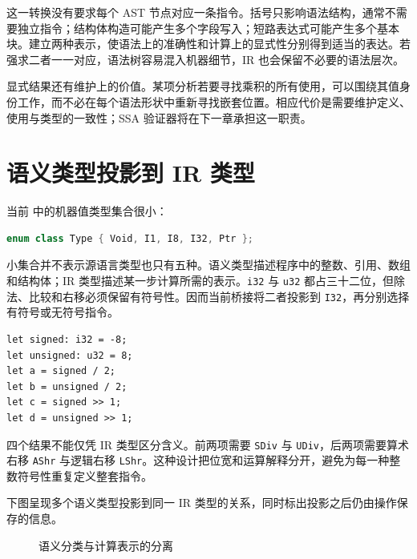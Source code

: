这一转换没有要求每个 AST 节点对应一条指令。括号只影响语法结构，通常不需要独立指令；结构体构造可能产生多个字段写入；短路表达式可能产生多个基本块。建立两种表示，使语法上的准确性和计算上的显式性分别得到适当的表达。若强求二者一一对应，语法树容易混入机器细节，IR 也会保留不必要的语法层次。

显式结果还有维护上的价值。某项分析若要寻找乘积的所有使用，可以围绕其值身份工作，而不必在每个语法形状中重新寻找嵌套位置。相应代价是需要维护定义、使用与类型的一致性；SSA 验证器将在下一章承担这一职责。

\section{语义类型投影到 IR 类型}
当前  中的机器值类型集合很小：
\begin{lstlisting}[language=C++,caption={当前 IR 的类型集合}]
enum class Type { Void, I1, I8, I32, Ptr };
\end{lstlisting}
小集合并不表示源语言类型也只有五种。语义类型描述程序中的整数、引用、数组和结构体；IR 类型描述某一步计算所需的表示。\texttt{i32} 与 \texttt{u32} 都占三十二位，但除法、比较和右移必须保留有符号性。因而当前桥接将二者投影到 \texttt{I32}，再分别选择有符号或无符号指令。
\begin{lstlisting}[language=Rustless,caption={同一位宽上的不同语义}]
let signed: i32 = -8;
let unsigned: u32 = 8;
let a = signed / 2;
let b = unsigned / 2;
let c = signed >> 1;
let d = unsigned >> 1;
\end{lstlisting}
四个结果不能仅凭 IR 类型区分含义。前两项需要 \texttt{SDiv} 与 \texttt{UDiv}，后两项需要算术右移 \texttt{AShr} 与逻辑右移 \texttt{LShr}。这种设计把位宽和运算解释分开，避免为每一种整数符号性重复定义整套指令。

下图呈现多个语义类型投影到同一 IR 类型的关系，同时标出投影之后仍由操作保存的信息。
\begin{figure}[htbp]\centering
{}
\caption{语义分类与计算表示的分离}
\end{figure}

